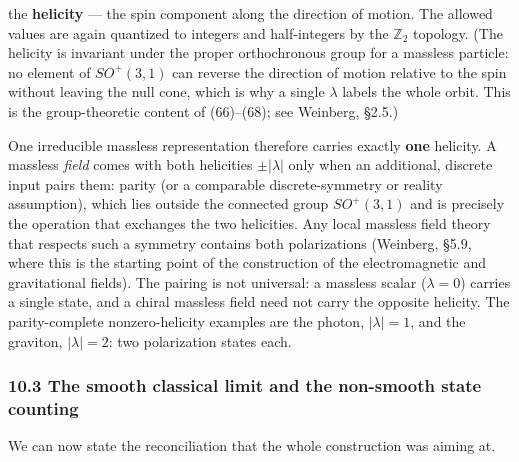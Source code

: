 \documentclass[
]{article}
\begin{document}
the \textbf{helicity} --- the spin component along the direction of
motion. The allowed values are again quantized to integers and
half-integers by the \(\mathbb{Z}_{2}\) topology. (The helicity is
invariant under the proper orthochronous group for a massless particle:
no element of \(SO^{+}(3,1)\) can reverse the direction of motion
relative to the spin without leaving the null cone, which is why a
single \(\lambda\) labels the whole orbit. This is the group-theoretic
content of (66)--(68); see Weinberg, §2.5.)

One irreducible massless representation therefore carries exactly
\textbf{one} helicity. A massless \emph{field} comes with both
helicities \(\pm |\lambda|\) only when an additional, discrete input
pairs them: parity (or a comparable discrete-symmetry or reality
assumption), which lies outside the connected group \(SO^{+}(3,1)\) and
is precisely the operation that exchanges the two helicities. Any local
massless field theory that respects such a symmetry contains both
polarizations (Weinberg, §5.9, where this is the starting point of the
construction of the electromagnetic and gravitational fields). The
pairing is not universal: a massless scalar (\(\lambda = 0\)) carries a
single state, and a chiral massless field need not carry the opposite
helicity. The parity-complete nonzero-helicity examples are the photon,
\(|\lambda| = 1\), and the graviton, \(|\lambda| = 2\): two polarization
states each.

\hypertarget{the-smooth-classical-limit-and-the-non-smooth-state-counting}{%
\subsubsection{10.3 The smooth classical limit and the non-smooth state
counting}\label{the-smooth-classical-limit-and-the-non-smooth-state-counting}}

We can now state the reconciliation that the whole construction was
aiming at.
\end{document}

